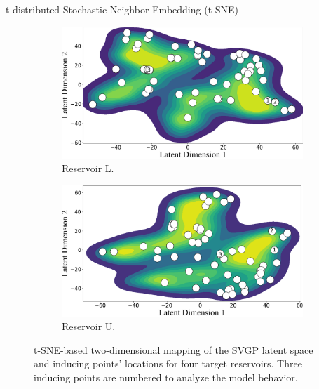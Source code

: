 \begin{frame}{t-distributed Stochastic Neighbor Embedding (t-SNE)}
\begin{figure}[htbp]
		\vspace{0.1cm} %
		
		\begin{subfigure}[t]{0.38\columnwidth}
			\centering
			\includegraphics[width=\columnwidth]{chp_sogp/figures/TSNE_task11_kde_p30.png}
			\caption{Reservoir L.}
		\end{subfigure}
		\hspace{0.05\columnwidth} %
		\begin{subfigure}[t]{0.38\columnwidth}
			\centering
			\includegraphics[width=\columnwidth]{chp_sogp/figures/TSNE_task20_kde_p30.png}
			\caption{Reservoir U.}
		\end{subfigure}
		
		\vspace{0.0cm} %
		
		\caption{t-SNE-based two-dimensional mapping of the SVGP latent space and inducing points' locations for four target reservoirs. Three inducing points are numbered to analyze the model behavior.}
	\end{figure}
\end{frame}



